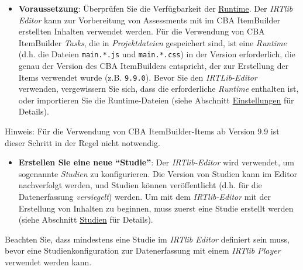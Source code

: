 \documentclass[
  letterpaper,
  DIV=11]{scrreprt}
\providecommand{\tightlist}{%
  \setlength{\itemsep}{0pt}\setlength{\parskip}{0pt}}\usepackage{longtable,booktabs,array}
\begin{document}
\begin{tcolorbox}[enhanced jigsaw, colbacktitle=quarto-callout-caution-color!10!white, coltitle=black, colframe=quarto-callout-caution-color-frame, leftrule=.75mm, breakable, opacitybacktitle=0.6, toprule=.15mm, title=\textcolor{quarto-callout-caution-color}{\faFire}\hspace{0.5em}{Optional}, colback=white, titlerule=0mm, arc=.35mm, bottomtitle=1mm, toptitle=1mm, rightrule=.15mm, bottomrule=.15mm, left=2mm, opacityback=0]

\begin{itemize}
\tightlist
\item
  \textbf{Voraussetzung}: Überprüfen Sie die Verfügbarkeit der
  \href{settings.qmd}{Runtime}. Der \emph{IRTlib Editor} kann zur
  Vorbereitung von Assessments mit im CBA ItemBuilder erstellten
  Inhalten verwendet werden. Für die Verwendung von CBA ItemBuilder
  \emph{Tasks}, die in \emph{Projektdateien} gespeichert sind, ist eine
  \emph{Runtime} (d.h. die Dateien \texttt{main.*.js} und
  \texttt{main.*.css}) in der Version erforderlich, die genau der
  Version des CBA ItemBuilders entspricht, der zur Erstellung der Items
  verwendet wurde (z.B. \texttt{9.9.0}). Bevor Sie den
  \emph{IRTLib-Editor} verwenden, vergewissern Sie sich, dass die
  erforderliche \emph{Runtime} enthalten ist, oder importieren Sie die
  Runtime-Dateien (siehe Abschnitt \href{settings.qmd}{Einstellungen}
  für Details).
\end{itemize}

Hinweis: Für die Verwendung von CBA ItemBuilder-Items ab Version 9.9 ist
dieser Schritt in der Regel nicht notwendig.

\end{tcolorbox}

\begin{itemize}
\tightlist
\item
  \textbf{Erstellen Sie eine neue ``Studie''}: Der \emph{IRTlib-Editor}
  wird verwendet, um sogenannte \emph{Studien} zu konfigurieren. Die
  Version von Studien kann im Editor nachverfolgt werden, und Studien
  können veröffentlicht (d.h. für die Datenerfassung \emph{versiegelt})
  werden. Um mit dem \emph{IRTlib-Editor} mit der Erstellung von
  Inhalten zu beginnen, muss zuerst eine Studie erstellt werden (siehe
  Abschnitt \protect\hyperlink{vorbereitung-studien}{Studien} für
  Details).
\end{itemize}

\begin{tcolorbox}[enhanced jigsaw, colbacktitle=quarto-callout-note-color!10!white, coltitle=black, colframe=quarto-callout-note-color-frame, leftrule=.75mm, breakable, opacitybacktitle=0.6, toprule=.15mm, title=\textcolor{quarto-callout-note-color}{\faInfo}\hspace{0.5em}{Hinweis}, colback=white, titlerule=0mm, arc=.35mm, bottomtitle=1mm, toptitle=1mm, rightrule=.15mm, bottomrule=.15mm, left=2mm, opacityback=0]

Beachten Sie, dass mindestens eine Studie im \emph{IRTlib Editor}
definiert sein muss, bevor eine Studienkonfiguration zur Datenerfassung
mit einem \emph{IRTlib Player} verwendet werden kann.

\end{tcolorbox}
\end{document}
